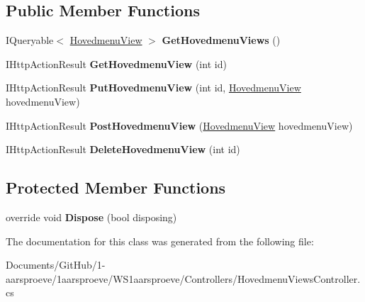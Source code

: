\subsection*{Public Member Functions}
\begin{DoxyCompactItemize}
\item 
\hypertarget{class_w_s1aarsproeve_1_1_controllers_1_1_hovedmenu_views_controller_ac8a29b90a6e0519f9526d30893538c7e}{}I\+Queryable$<$ \hyperlink{class_w_s1aarsproeve_1_1_hovedmenu_view}{Hovedmenu\+View} $>$ {\bfseries Get\+Hovedmenu\+Views} ()\label{class_w_s1aarsproeve_1_1_controllers_1_1_hovedmenu_views_controller_ac8a29b90a6e0519f9526d30893538c7e}

\item 
\hypertarget{class_w_s1aarsproeve_1_1_controllers_1_1_hovedmenu_views_controller_a7f31b895ac86bc72c84dbd5880652c37}{}I\+Http\+Action\+Result {\bfseries Get\+Hovedmenu\+View} (int id)\label{class_w_s1aarsproeve_1_1_controllers_1_1_hovedmenu_views_controller_a7f31b895ac86bc72c84dbd5880652c37}

\item 
\hypertarget{class_w_s1aarsproeve_1_1_controllers_1_1_hovedmenu_views_controller_a1716184c3a76619a64201200b3efd202}{}I\+Http\+Action\+Result {\bfseries Put\+Hovedmenu\+View} (int id, \hyperlink{class_w_s1aarsproeve_1_1_hovedmenu_view}{Hovedmenu\+View} hovedmenu\+View)\label{class_w_s1aarsproeve_1_1_controllers_1_1_hovedmenu_views_controller_a1716184c3a76619a64201200b3efd202}

\item 
\hypertarget{class_w_s1aarsproeve_1_1_controllers_1_1_hovedmenu_views_controller_abe6a4faf41194b4b5bfcdd94c19096ca}{}I\+Http\+Action\+Result {\bfseries Post\+Hovedmenu\+View} (\hyperlink{class_w_s1aarsproeve_1_1_hovedmenu_view}{Hovedmenu\+View} hovedmenu\+View)\label{class_w_s1aarsproeve_1_1_controllers_1_1_hovedmenu_views_controller_abe6a4faf41194b4b5bfcdd94c19096ca}

\item 
\hypertarget{class_w_s1aarsproeve_1_1_controllers_1_1_hovedmenu_views_controller_a7c10a83a30861f833e1305e6880bc6e2}{}I\+Http\+Action\+Result {\bfseries Delete\+Hovedmenu\+View} (int id)\label{class_w_s1aarsproeve_1_1_controllers_1_1_hovedmenu_views_controller_a7c10a83a30861f833e1305e6880bc6e2}

\end{DoxyCompactItemize}
\subsection*{Protected Member Functions}
\begin{DoxyCompactItemize}
\item 
\hypertarget{class_w_s1aarsproeve_1_1_controllers_1_1_hovedmenu_views_controller_a75f5a9e12cc28c141407d11a9af91009}{}override void {\bfseries Dispose} (bool disposing)\label{class_w_s1aarsproeve_1_1_controllers_1_1_hovedmenu_views_controller_a75f5a9e12cc28c141407d11a9af91009}

\end{DoxyCompactItemize}


The documentation for this class was generated from the following file\+:\begin{DoxyCompactItemize}
\item 
Documents/\+Git\+Hub/1-\/aarsproeve/1aarsproeve/\+W\+S1aarsproeve/\+Controllers/Hovedmenu\+Views\+Controller.\+cs\end{DoxyCompactItemize}
